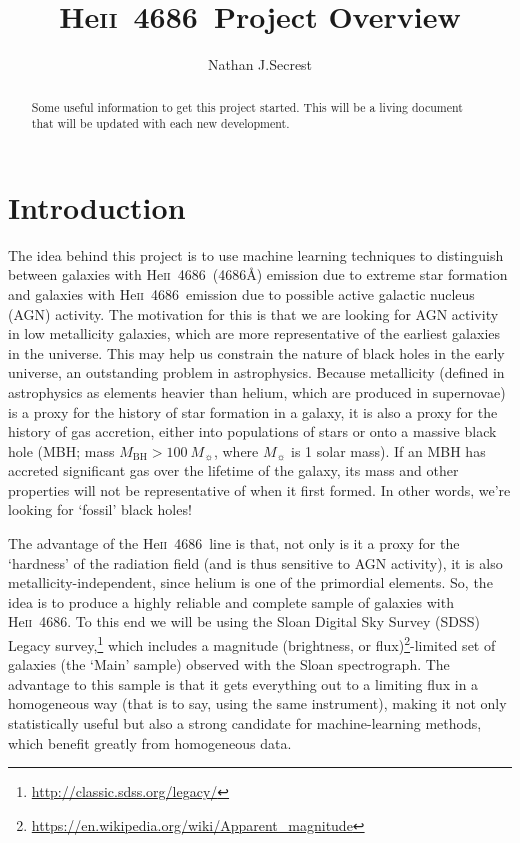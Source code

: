 \documentclass[iop,apj]{emulateapj}
\def\init{\hspace{0.75 mm}}
\def\heii{He\hspace{1mm}\textsc{ii}~4686}
\begin{document}
\title{\heii\ Project Overview}

\author{Nathan J.\init Secrest}




\begin{abstract}

Some useful information to get this project started. This will be a living document that will be updated with each new development.

\end{abstract}





\section{Introduction}
\label{intro}

The idea behind this project is to use machine learning techniques to distinguish between galaxies with \heii\ (4686\AA) emission due to extreme star formation and galaxies with \heii\ emission due to possible active galactic nucleus (AGN) activity. The motivation for this is that we are looking for AGN activity in low metallicity galaxies, which are more representative of the earliest galaxies in the universe. This may help us constrain the nature of black holes in the early universe, an outstanding problem in astrophysics. Because metallicity (defined in astrophysics as elements heavier than helium, which are produced in supernovae) is a proxy for the history of star formation in a galaxy, it is also a proxy for the history of gas accretion, either into populations of stars or onto a massive black hole (MBH; mass $M_\textrm{BH} > 100~M_\sun$, where $M_\sun$ is 1 solar mass). If an MBH has accreted significant gas over the lifetime of the galaxy, its mass and other properties will not be representative of when it first formed. In other words, we're looking for `fossil' black holes!

The advantage of the \heii\ line is that, not only is it a proxy for the `hardness' of the radiation field (and is thus sensitive to AGN activity), it is also metallicity-independent, since helium is one of the primordial elements. So, the idea is to produce a highly reliable and complete sample of galaxies with \heii. To this end we will be using the Sloan Digital Sky Survey (SDSS) Legacy survey,\footnote{\url{http://classic.sdss.org/legacy/}} which includes a magnitude (brightness, or flux)\footnote{\url{https://en.wikipedia.org/wiki/Apparent_magnitude}}-limited set of galaxies (the `Main' sample) observed with the Sloan spectrograph. The advantage to this sample is that it gets everything out to a limiting flux in a homogeneous way (that is to say, using the same instrument), making it not only statistically useful but also a strong candidate for machine-learning methods, which benefit greatly from homogeneous data.
\end{document}
